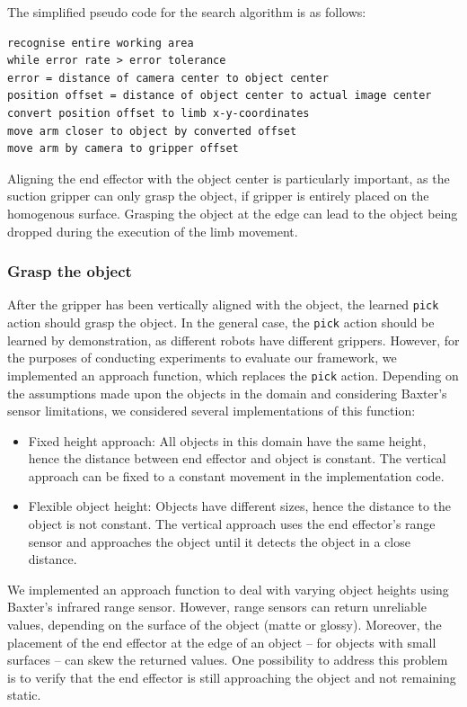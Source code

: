 The simplified pseudo code for the search algorithm is as follows:

\begin{verbatim}
recognise entire working area
while error rate > error tolerance
error = distance of camera center to object center
position offset = distance of object center to actual image center
convert position offset to limb x-y-coordinates
move arm closer to object by converted offset
move arm by camera to gripper offset
\end{verbatim}
Aligning the end effector with the object center is particularly important, as the suction gripper can only grasp the object, if gripper is entirely placed on the homogenous surface.
Grasping the object at the edge can lead to the object being dropped during the execution of the limb movement.

\subsubsection{Grasp the object}
After the gripper has been vertically aligned with the object, the learned \texttt{pick} action should grasp the object.
In the general case, the \texttt{pick} action should be learned by demonstration, as different robots have different grippers.
However, for the purposes of conducting experiments to evaluate our framework, we implemented an approach function, which replaces the \texttt{pick} action.
Depending on the assumptions made upon the objects in the domain and considering Baxter's sensor limitations, we considered several implementations of this function:
\begin{itemize}
	\item Fixed height approach: All objects in this domain have the same height, hence the distance between end effector and object is constant.
	The vertical approach can be fixed to a constant movement in the implementation code.
	\item Flexible object height: Objects have different sizes, hence the distance to the object is not constant.
	The vertical approach uses the end effector's range sensor and approaches the object until it detects the object in a close distance.
\end{itemize}
We implemented an approach function to deal with varying object heights using Baxter's infrared range sensor.
However, range sensors can return unreliable values, depending on the surface of the object (matte or glossy).
Moreover, the placement of the end effector at the edge of an object -- \eg
for objects with small surfaces -- can skew the returned values.
One possibility to address this problem is to verify that the end effector is still approaching the object and not remaining static.


